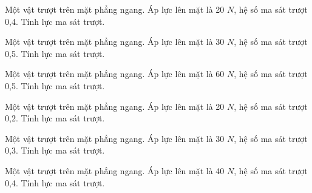 \begin{ex}
Một vật trượt trên mặt phẳng ngang. Áp lực lên mặt là 20 $N$, hệ số ma sát trượt 0,4. Tính lực ma sát trượt.
\end{ex}

\begin{ex}
Một vật trượt trên mặt phẳng ngang. Áp lực lên mặt là 30 $N$, hệ số ma sát trượt 0,5. Tính lực ma sát trượt.
\end{ex}

\begin{bt}
Một vật trượt trên mặt phẳng ngang. Áp lực lên mặt là 60 $N$, hệ số ma sát trượt 0,5. Tính lực ma sát trượt.
\end{bt}

\begin{bt}
Một vật trượt trên mặt phẳng ngang. Áp lực lên mặt là 20 $N$, hệ số ma sát trượt 0,2. Tính lực ma sát trượt.
\end{bt}

\begin{bt}
Một vật trượt trên mặt phẳng ngang. Áp lực lên mặt là 30 $N$, hệ số ma sát trượt 0,3. Tính lực ma sát trượt.
\end{bt}

\begin{bt}
Một vật trượt trên mặt phẳng ngang. Áp lực lên mặt là 40 $N$, hệ số ma sát trượt 0,4. Tính lực ma sát trượt.
\end{bt}

